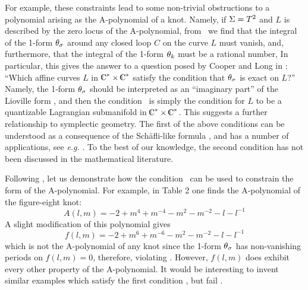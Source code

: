 For example,
these constraints lead to some non-trivial obstructions
to a polynomial arising as the A-polynomial of a knot.
Namely, if ${\Sigma}=T^2$ and $L$ is described by
the zero locus of the A-polynomial, from \ksquantcond\
we find that 
the integral of the 1-form $\theta_{\sigma}$
around any closed loop $C$ on the curve $L$ must vanish,
%
\eqn{}
%
and, furthermore, that the integral of the 1-form $\theta_k$
must be a rational number,
%
\eqn{}
%
In particular, this gives the answer to a question
posed by Cooper and Long in :
``Which affine curves $L$ in $\IC^* \times \IC^*$ satisfy
the condition that $\theta_{\sigma}$ is exact on $L$?''
Namely, the 1-form $\theta_{\sigma}$ should be interpreted as
an ``imaginary part'' of the Lioville form \tottheta,
and then the condition \sobstruction\ is simply the condition
for $L$ to be a quantizable Lagrangian submanifold in $\IC^* \times \IC^*$.
This suggests a further relationship to symplectic geometry.
The first of the above conditions can be understood as
a consequence of the Sch\"afli-like formula \volfla,
and has a number of applications, see {\it e.g.} \CLrem.
To the best of our knowledge, the second condition
has not been discussed in the mathematical literature.

\example{}

Following \CLrem, let us demonstrate how the condition \sobstruction\
can be used to constrain the form of the A-polynomial.
For example, in Table 2 one finds the A-polynomial of
the figure-eight knot:
$$
A(l,m) = -2+m^4+m^{-4}-m^2-m^{-2}-l-l^{-1}
$$
A slight modification of this polynomial gives
$$
f(l,m) = -2+m^6+m^{-6}-m^2-m^{-2}-l-l^{-1}
$$
which is not the A-polynomial of any knot since the 1-form $\theta_{\sigma}$
has non-vanishing periods on $f(l,m)=0$, therefore, violating \sobstruction.
However, $f(l,m)$ does exhibit every other property of the A-polynomial.
It would be interesting to invent similar examples which satisfy
the first condition \sobstruction, but fail \kobstruction.


